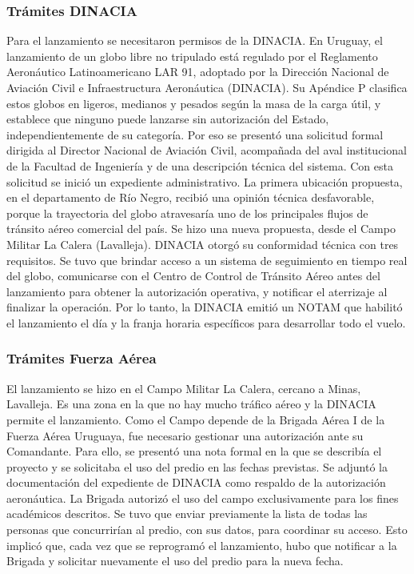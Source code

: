 \documentclass[12pt,a4paper]{article}
\begin{document}
\subsubsection{Trámites DINACIA}\label{tramites-dinacia}

Para el lanzamiento se necesitaron permisos de la DINACIA. En Uruguay, el lanzamiento de un globo libre no tripulado está regulado por el Reglamento Aeronáutico Latinoamericano LAR 91, adoptado por la Dirección Nacional de Aviación Civil e Infraestructura Aeronáutica (DINACIA). Su Apéndice P clasifica estos globos en ligeros, medianos y pesados según la masa de la carga útil, y establece que ninguno puede lanzarse sin autorización del Estado, independientemente de su categoría. Por eso se presentó una solicitud formal dirigida al Director Nacional de Aviación Civil, acompañada del aval institucional de la Facultad de Ingeniería y de una descripción técnica del sistema. Con esta solicitud se inició un expediente administrativo. La primera ubicación propuesta, en el departamento de Río Negro, recibió una opinión técnica desfavorable, porque la trayectoria del globo atravesaría uno de los principales flujos de tránsito aéreo comercial del país. Se hizo una nueva propuesta, desde el Campo Militar La Calera (Lavalleja). DINACIA otorgó su conformidad técnica con tres requisitos. Se tuvo que brindar acceso a un sistema de seguimiento en tiempo real del globo, comunicarse con el Centro de Control de Tránsito Aéreo antes del lanzamiento para obtener la autorización operativa, y notificar el aterrizaje al finalizar la operación. Por lo tanto, la DINACIA emitió un NOTAM que habilitó el lanzamiento el día y la franja horaria específicos para desarrollar todo el vuelo.

\subsubsection{Trámites Fuerza Aérea}\label{tramites-fuerza-aerea}

El lanzamiento se hizo en el Campo Militar La Calera, cercano a Minas, Lavalleja. Es una zona en la que no hay mucho tráfico aéreo y la DINACIA permite el lanzamiento. Como el Campo depende de la Brigada Aérea I de la Fuerza Aérea Uruguaya, fue necesario gestionar una autorización ante su Comandante. Para ello, se presentó una nota formal en la que se describía el proyecto y se solicitaba el uso del predio en las fechas previstas. Se adjuntó la documentación del expediente de DINACIA como respaldo de la autorización aeronáutica. La Brigada autorizó el uso del campo exclusivamente para los fines académicos descritos. Se tuvo que enviar previamente la lista de todas las personas que concurrirían al predio, con sus datos, para coordinar su acceso. Esto implicó que, cada vez que se reprogramó el lanzamiento, hubo que notificar a la Brigada y solicitar nuevamente el uso del predio para la nueva fecha.
\end{document}
